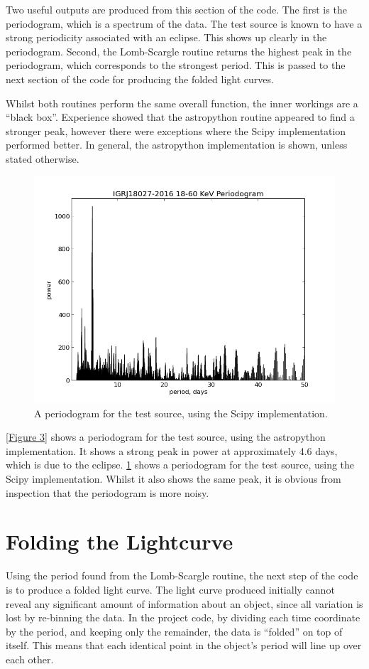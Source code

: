 Two useful outputs are produced from this section of the code. The first is the periodogram, which is a spectrum of the data. The test source is known to have a strong periodicity associated with an eclipse. This shows up clearly in the periodogram. Second, the Lomb-Scargle routine returns the highest peak in the periodogram, which corresponds to the strongest period. This is passed to the next section of the code for producing the folded light curves.

Whilst both routines perform the same overall function, the inner workings are a \textquotedblleft{}black box\textquotedblright{}. Experience showed that the astropython routine appeared to find a stronger peak, however there were exceptions where the Scipy implementation performed better. In general, the astropython implementation is shown, unless stated otherwise.

\begin{figure}[h!]
\centering
\includegraphics[width=130mm]{gfx/Fig4.png}
\caption{A periodogram for the test source, using the Scipy implementation.}
\label{Figure 4}
\end{figure}


\ref{Figure 3} shows a periodogram for the test source, using the astropython implementation. It shows a strong peak in power at approximately 4.6 days, which is due to the eclipse.
\ref{Figure 4} shows a periodogram for the test source, using the Scipy implementation. Whilst it also shows the same peak, it is obvious from inspection that the periodogram is more noisy.

\section{Folding the Lightcurve}
Using the period found from the Lomb-Scargle routine, the next step of the code is to produce a folded light curve. The light curve produced initially cannot reveal any significant amount of information about an object, since all variation is lost by re-binning the data. In the project code, by dividing each time coordinate by the period, and keeping only the remainder, the data is \textquotedblleft{}folded\textquotedblright{} on top of itself. This means that each identical point in the object\textquoteright{}s period will line up over each other. 

